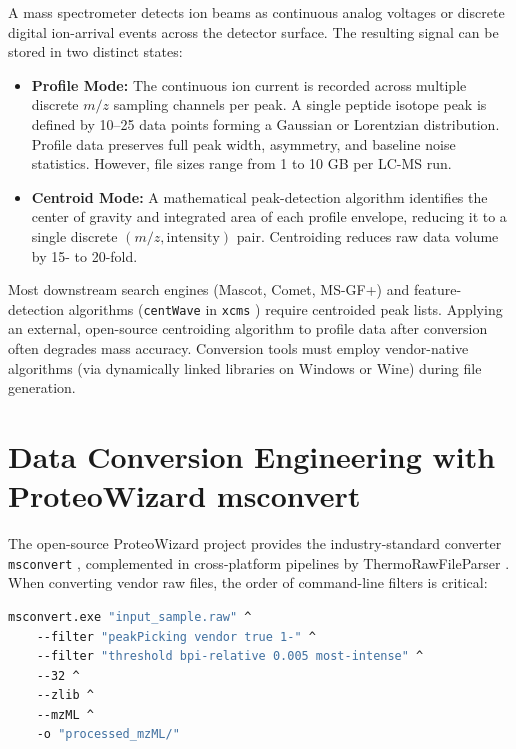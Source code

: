 \documentclass[11pt,twoside,openright]{book}
\begin{document}
A mass spectrometer detects ion beams as continuous analog voltages or discrete digital ion-arrival events across the detector surface. The resulting signal can be stored in two distinct states:
\begin{itemize}
    \item \textbf{Profile Mode:} The continuous ion current is recorded across multiple discrete $m/z$ sampling channels per peak. A single peptide isotope peak is defined by 10--25 data points forming a Gaussian or Lorentzian distribution. Profile data preserves full peak width, asymmetry, and baseline noise statistics. However, file sizes range from 1 to 10 GB per LC-MS run.
    \item \textbf{Centroid Mode:} A mathematical peak-detection algorithm identifies the center of gravity and integrated area of each profile envelope, reducing it to a single discrete $(m/z, \text{intensity})$ pair. Centroiding reduces raw data volume by 15- to 20-fold.
\end{itemize}

Most downstream search engines (Mascot, Comet, MS-GF+) and feature-detection algorithms (\texttt{centWave} in \texttt{xcms} \cite{tautenhahn2008centwave, cox2008maxquant}) require centroided peak lists. Applying an external, open-source centroiding algorithm to profile data after conversion often degrades mass accuracy. Conversion tools must employ vendor-native algorithms (via dynamically linked libraries on Windows or Wine) during file generation.

\section{Data Conversion Engineering with ProteoWizard msconvert}
\label{sec:msconvert_engineering}

The open-source ProteoWizard project provides the industry-standard converter \texttt{msconvert} \cite{chambers2012proteowizard}, complemented in cross-platform pipelines by ThermoRawFileParser \cite{hulstaert2020thermorawfileparser}. When converting vendor raw files, the order of command-line filters is critical:
\begin{lstlisting}[language=bash]
msconvert.exe "input_sample.raw" ^
    --filter "peakPicking vendor true 1-" ^
    --filter "threshold bpi-relative 0.005 most-intense" ^
    --32 ^
    --zlib ^
    --mzML ^
    -o "processed_mzML/"
\end{lstlisting}
\end{document}
